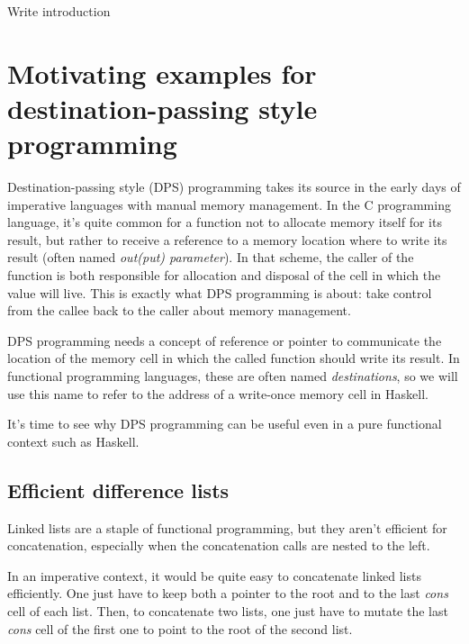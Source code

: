 \documentclass[english]{jflart}
\newcommand{\TODO}[1]{{\color{red}\large #1}}
\begin{document}
\TODO{Write introduction}


\section{Motivating examples for destination-passing style programming}\label{sec:motivating-examples}

Destination-passing style (DPS) programming takes its source in the early days of imperative languages with manual memory management. In the C programming language, it's quite common for a function not to allocate memory itself for its result, but rather to receive a reference to a memory location where to write its result (often named \emph{out(put) parameter}). In that scheme, the caller of the function is both responsible for allocation and disposal of the cell in which the value will live. This is exactly what DPS programming is about: take control from the callee back to the caller about memory management.

DPS programming needs a concept of reference or pointer to communicate the location of the memory cell in which the called function should write its result. In functional programming languages, these are often named \emph{destinations}, so we will use this name to refer to the address of a write-once memory cell in Haskell.

It's time to see why DPS programming can be useful even in a pure functional context such as Haskell.

\subsection{Efficient difference lists}

Linked lists are a staple of functional programming, but they aren't efficient for concatenation, especially when the concatenation calls are nested to the left.

In an imperative context, it would be quite easy to concatenate linked lists efficiently. One just have to keep both a pointer to the root and to the last \emph{cons} cell of each list. Then, to concatenate two lists, one just have to mutate the last \emph{cons} cell of the first one to point to the root of the second list.
\end{document}
